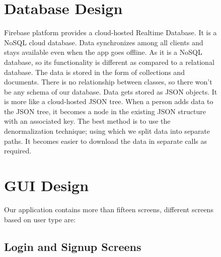 \begin{figure}
\section{Database Design}
Firebase platform provides a cloud-hosted Realtime Database. It is a NoSQL cloud database. Data synchronizes among all clients and stays available even when the app goes offline. As it is a NoSQL database, so its functionality is different as compared to a relational database. The data is stored in the form of collections and documents. There is no relationship between classes, so there won’t be any schema of our database. Data gets stored as JSON objects. It is more like a cloud-hosted JSON tree. When a person adds data to the JSON tree, it becomes a node in the existing JSON structure with an associated key. The best method is to use the denormalization technique; using which we split data into separate paths. It becomes easier to download the data in separate calls as required.
\end{figure}

\begin{figure}
\section{GUI Design}
Our application contains more than fifteen screens, different screens based on user type are:
\end{figure}



\begin{figure}
\subsection{Login and Signup Screens}
\hspace*{\fill}
\hfill 
{}
\hspace*{\fill}

\end{figure}

\begin{figure}
\hspace*{\fill}
\hfill 
{}
\hspace*{\fill}
\end{figure}

